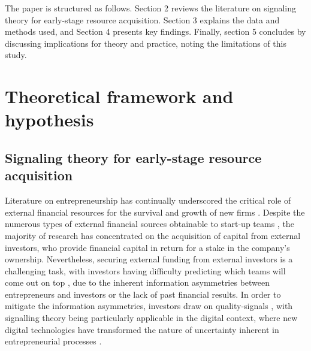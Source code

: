 \documentclass[12pt]{article}
\begin{document}
The paper is structured as follows. Section 2 reviews the literature on signaling theory for early-stage resource acquisition. Section 3 explains the data and methods used, and Section 4 presents key findings. Finally, section 5 concludes by discussing implications for theory and practice, noting the limitations of this study.


\section{Theoretical framework and hypothesis}

\subsection{Signaling theory for early-stage resource acquisition}

Literature on entrepreneurship has continually underscored the critical role of external financial resources for the survival and growth of new firms \citep{cooper1994initial}. Despite the numerous types of external financial sources obtainable to start-up teams \citep{drover2017review, klein2020start}, the majority of research has concentrated on the acquisition of capital from external investors, who provide financial capital in return for a stake in the company's ownership. Nevertheless, securing external funding from external investors is a challenging task, with investors having difficulty predicting which teams will come out on top \citep{ghassemiautomated}, due to the inherent information asymmetries between entrepreneurs and investors or the lack of past financial results. In order to mitigate the information asymmetries, investors draw on quality-signals \citep{spence1978job, ko2018signaling}, with signalling theory being particularly applicable in the digital context, where new digital technologies have transformed the nature of uncertainty inherent in entrepreneurial processes \citep{nambisan2017digital}.
\end{document}
